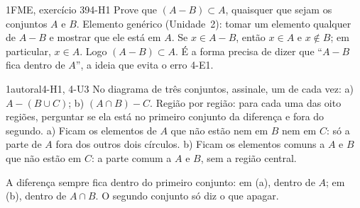 \begin{exemplo}{}{1}{FME, exercício 39}{4-H1}
\label{ex:u4:contido}
Prove que $(A-B)\subset A$, quaisquer que sejam os conjuntos $A$ e $B$.
\plano Elemento genérico (Unidade~2): tomar um elemento qualquer de $A-B$ e mostrar que ele está em $A$.
\resolucao Se $x\in A-B$, então $x\in A$ e $x\notin B$; em particular, $x\in A$. Logo $(A-B)\subset A$.
\comentario É a forma precisa de dizer que \enquote{$A-B$ fica dentro de $A$}, a ideia que evita o erro 4-E1.
\end{exemplo}

\begin{exemplo}{}{1}{autoral}{4-H1, 4-U3}
\label{ex:u4:sombrear}
No diagrama de três conjuntos, assinale, um de cada vez: a) $A-(B\cup C)$; b) $(A\cap B)-C$.
\plano Região por região: para cada uma das oito regiões, perguntar se ela está no primeiro conjunto da diferença e fora do segundo.
\resolucao a) Ficam os elementos de $A$ que não estão nem em $B$ nem em $C$: só a parte de $A$ fora dos outros dois círculos. b) Ficam os elementos comuns a $A$ e $B$ que não estão em $C$: a parte comum a $A$ e $B$, sem a região central.
\begin{center}
\end{center}
\comentario A diferença sempre fica dentro do primeiro conjunto: em (a), dentro de $A$; em (b), dentro de $A\cap B$. O segundo conjunto só diz o que apagar.
\end{exemplo}

